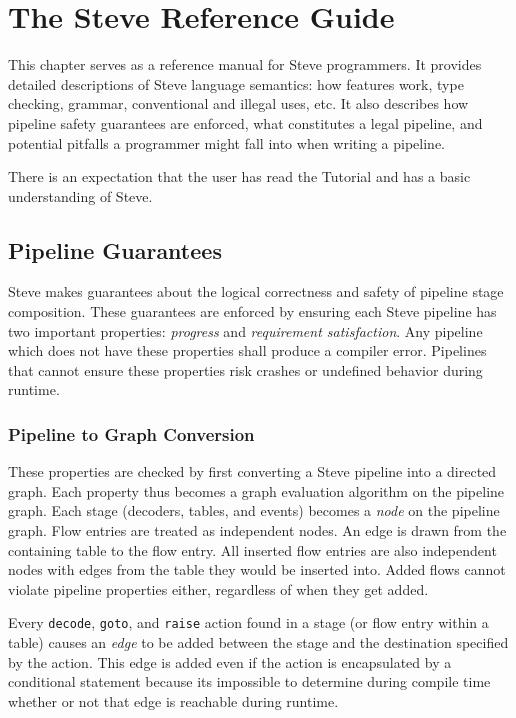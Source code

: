 \chapter{The Steve Reference Guide} \label{ch:users_guide}

This chapter serves as a reference manual for Steve programmers. It provides detailed descriptions of Steve language semantics: how features work, type checking, grammar, conventional and illegal uses, etc. It also describes how pipeline safety guarantees are enforced, what constitutes a legal pipeline, and potential pitfalls a programmer might fall into when writing a pipeline.

There is an expectation that the user has read the Tutorial and has a basic understanding of Steve.

\section{Pipeline Guarantees} \label{guide:pipeline_checking}

Steve makes guarantees about the logical correctness and safety of pipeline stage composition. These guarantees are enforced by ensuring each Steve pipeline has two important properties: \textit{progress} and \textit{requirement satisfaction}. Any pipeline which does not have these properties shall produce a compiler error. Pipelines that cannot ensure these properties risk crashes or undefined behavior during runtime.

\subsection{Pipeline to Graph Conversion} \label{guide:pipeline_graph}

These properties are checked by first converting a Steve pipeline into a directed graph. Each property thus becomes a graph evaluation algorithm on the pipeline graph. Each stage (decoders, tables, and events) becomes a \textit{node} on the pipeline graph. Flow entries are treated as independent nodes. An edge is drawn from the containing table to the flow entry. All inserted flow entries are also independent nodes with edges from the table they would be inserted into. Added flows cannot violate pipeline properties either, regardless of when they get added.

Every \texttt{decode}, \texttt{goto}, and \texttt{raise} action found in a stage (or flow entry within a table) causes an \textit{edge} to be added between the stage and the destination specified by the action. This edge is added even if the action is encapsulated by a conditional statement because its impossible to determine during compile time whether or not that edge is reachable during runtime.

